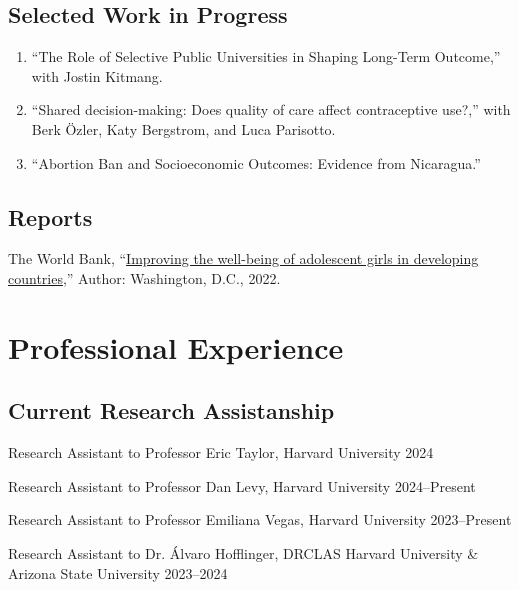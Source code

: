 \documentclass[a4paper, 10pt]{article}
\renewenvironment{itemize}{
  \begin{list}{}
    { \setlength{\itemsep}{5pt}
      \setlength{\parsep}{0pt}
      \setlength{\topsep}{0pt}
      \setlength{\leftmargin}{0em} } }{
  \end{list}}
\begin{document}
\subsection*{Selected Work in Progress}

\begin{enumerate}[leftmargin=10pt, label={}, itemindent=-10pt, nosep]
\item ``The Role of Selective Public Universities in Shaping Long-Term
Outcome,'' with Jostin Kitmang. 
\item ``Shared decision-making: Does quality of care affect contraceptive
use?,'' with Berk Özler, Katy Bergstrom, and Luca Parisotto.
  \item ``Abortion Ban and Socioeconomic Outcomes: Evidence from Nicaragua.''
\end{enumerate}

\subsection*{Reports}

\begin{itemize}
\item The World Bank,
``\href{https://documents1.worldbank.org/curated/en/099025312242111019/pdf/P1699940bcc13001a083820804f74e8151b.pdf}{Improving
the well-being of adolescent girls in developing countries},'' Author:
Washington, D.C., 2022. 
\end{itemize}


\section*{Professional Experience}

\subsection*{Current Research Assistanship}

\begin{itemize}
  \item Research Assistant to Professor Eric Taylor, Harvard University 
  \hfill 2024 
  \item Research Assistant to Professor Dan Levy, Harvard University
  \hfill 2024--Present
  \item Research Assistant to Professor Emiliana Vegas, Harvard University
  \hfill 2023--Present
  \item Research Assistant to Dr. Álvaro Hofflinger, DRCLAS Harvard University
  \& Arizona State University
  \hfill 2023--2024
\end{itemize}
\end{document}
